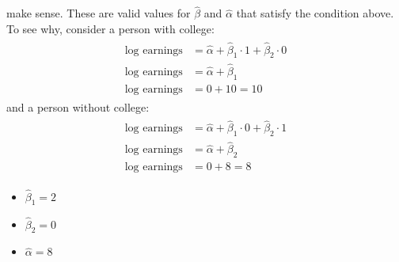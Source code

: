 \documentclass[letterpaper,10pt,english]{jupyterBook}
\begin{document}
\sphinxAtStartPar
make sense. These are valid values for \(\hat{\beta}\) and \(\hat{\alpha}\) that satisfy the condition above. To see why, consider a person with college:
\begin{equation*}
\begin{split}\begin{aligned}
\text{log earnings} &= \hat{\alpha} + \hat{\beta}_1 \cdot 1 + \hat{\beta}_2 \cdot 0 \\
\text{log earnings} &= \hat{\alpha} + \hat{\beta}_1 \\
\text{log earnings} &= 0 + 10 = 10
\end{aligned}\end{split}
\end{equation*}
\sphinxAtStartPar
and a person without college:
\begin{equation*}
\begin{split}\begin{aligned}
\text{log earnings} &= \hat{\alpha} + \hat{\beta}_1 \cdot 0 + \hat{\beta}_2 \cdot 1 \\
\text{log earnings} &= \hat{\alpha} + \hat{\beta}_2 \\
\text{log earnings} &= 0 + 8 = 8
\end{aligned}\end{split}
\end{equation*}\begin{itemize}
\item {} 
\sphinxAtStartPar
\(\hat{\beta}_1 = 2\)

\item {} 
\sphinxAtStartPar
\(\hat{\beta}_2 = 0\)

\item {} 
\sphinxAtStartPar
\(\hat{\alpha} = 8\)

\end{itemize}
\end{document}
